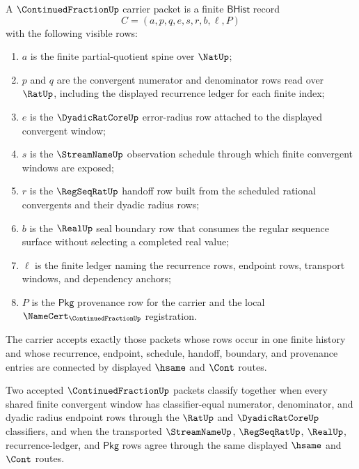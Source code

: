 \begin{definition}
\label{def:continuedfraction-carrier}
A $\ContinuedFractionUp$ carrier packet is a finite $\mathsf{BHist}$ record
$$
C=(a,p,q,e,s,r,b,\ell,P)
$$
with the following visible rows:
\begin{enumerate}
\item $a$ is the finite partial-quotient spine over $\NatUp$;
\item $p$ and $q$ are the convergent numerator and denominator rows read over
$\RatUp$, including the displayed recurrence ledger for each finite index;
\item $e$ is the $\DyadicRatCoreUp$ error-radius row attached to the displayed
convergent window;
\item $s$ is the $\StreamNameUp$ observation schedule through which finite
convergent windows are exposed;
\item $r$ is the $\RegSeqRatUp$ handoff row built from the scheduled rational
convergents and their dyadic radius rows;
\item $b$ is the $\RealUp$ seal boundary row that consumes the regular
sequence surface without selecting a completed real value;
\item $\ell$ is the finite ledger naming the recurrence rows, endpoint rows,
transport windows, and dependency anchors;
\item $P$ is the $\mathsf{Pkg}$ provenance row for the carrier and the local
$\NameCert_{\ContinuedFractionUp}$ registration.
\end{enumerate}
The carrier accepts exactly those packets whose rows occur in one finite
history and whose recurrence, endpoint, schedule, handoff, boundary, and
provenance entries are connected by displayed $\hsame$ and $\Cont$ routes.
\end{definition}

\begin{definition}
\label{def:continuedfraction-classifier}
Two accepted $\ContinuedFractionUp$ packets classify together when every shared
finite convergent window has classifier-equal numerator, denominator, and
dyadic radius endpoint rows through the $\RatUp$ and $\DyadicRatCoreUp$
classifiers, and when the transported $\StreamNameUp$, $\RegSeqRatUp$,
$\RealUp$, recurrence-ledger, and $\mathsf{Pkg}$ rows agree through the same
displayed $\hsame$ and $\Cont$ routes.
\end{definition}

